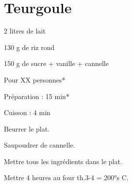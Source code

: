 \section{Teurgoule}

\begin{ingredients}
\item 2 litres de lait
\item 130 g de riz rond
\item 150 g de sucre + vanille + cannelle
\end{ingredients}
\begin{infos}
\item Pour XX personnes*		%
\item Préparation : 15 min*		%
\item Cuisson : 4 min			%
\end{infos}
\begin{etapes}
\item Beurrer le plat.
\item Saupoudrer de cannelle.
\item Mettre tous les ingrédients dans le plat.
\item Mettre 4 heures au four th.3-4 = 200°s C.
\end{etapes}
\begin{conseils}
\end{conseils}
